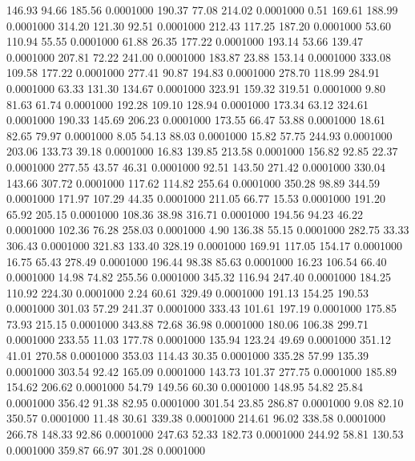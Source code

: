  146.93   94.66  185.56   0.0001000
 190.37   77.08  214.02   0.0001000
   0.51  169.61  188.99   0.0001000
 314.20  121.30   92.51   0.0001000
 212.43  117.25  187.20   0.0001000
  53.60  110.94   55.55   0.0001000
  61.88   26.35  177.22   0.0001000
 193.14   53.66  139.47   0.0001000
 207.81   72.22  241.00   0.0001000
 183.87   23.88  153.14   0.0001000
 333.08  109.58  177.22   0.0001000
 277.41   90.87  194.83   0.0001000
 278.70  118.99  284.91   0.0001000
  63.33  131.30  134.67   0.0001000
 323.91  159.32  319.51   0.0001000
   9.80   81.63   61.74   0.0001000
 192.28  109.10  128.94   0.0001000
 173.34   63.12  324.61   0.0001000
 190.33  145.69  206.23   0.0001000
 173.55   66.47   53.88   0.0001000
  18.61   82.65   79.97   0.0001000
   8.05   54.13   88.03   0.0001000
  15.82   57.75  244.93   0.0001000
 203.06  133.73   39.18   0.0001000
  16.83  139.85  213.58   0.0001000
 156.82   92.85   22.37   0.0001000
 277.55   43.57   46.31   0.0001000
  92.51  143.50  271.42   0.0001000
 330.04  143.66  307.72   0.0001000
 117.62  114.82  255.64   0.0001000
 350.28   98.89  344.59   0.0001000
 171.97  107.29   44.35   0.0001000
 211.05   66.77   15.53   0.0001000
 191.20   65.92  205.15   0.0001000
 108.36   38.98  316.71   0.0001000
 194.56   94.23   46.22   0.0001000
 102.36   76.28  258.03   0.0001000
   4.90  136.38   55.15   0.0001000
 282.75   33.33  306.43   0.0001000
 321.83  133.40  328.19   0.0001000
 169.91  117.05  154.17   0.0001000
  16.75   65.43  278.49   0.0001000
 196.44   98.38   85.63   0.0001000
  16.23  106.54   66.40   0.0001000
  14.98   74.82  255.56   0.0001000
 345.32  116.94  247.40   0.0001000
 184.25  110.92  224.30   0.0001000
   2.24   60.61  329.49   0.0001000
 191.13  154.25  190.53   0.0001000
 301.03   57.29  241.37   0.0001000
 333.43  101.61  197.19   0.0001000
 175.85   73.93  215.15   0.0001000
 343.88   72.68   36.98   0.0001000
 180.06  106.38  299.71   0.0001000
 233.55   11.03  177.78   0.0001000
 135.94  123.24   49.69   0.0001000
 351.12   41.01  270.58   0.0001000
 353.03  114.43   30.35   0.0001000
 335.28   57.99  135.39   0.0001000
 303.54   92.42  165.09   0.0001000
 143.73  101.37  277.75   0.0001000
 185.89  154.62  206.62   0.0001000
  54.79  149.56   60.30   0.0001000
 148.95   54.82   25.84   0.0001000
 356.42   91.38   82.95   0.0001000
 301.54   23.85  286.87   0.0001000
   9.08   82.10  350.57   0.0001000
  11.48   30.61  339.38   0.0001000
 214.61   96.02  338.58   0.0001000
 266.78  148.33   92.86   0.0001000
 247.63   52.33  182.73   0.0001000
 244.92   58.81  130.53   0.0001000
 359.87   66.97  301.28   0.0001000
